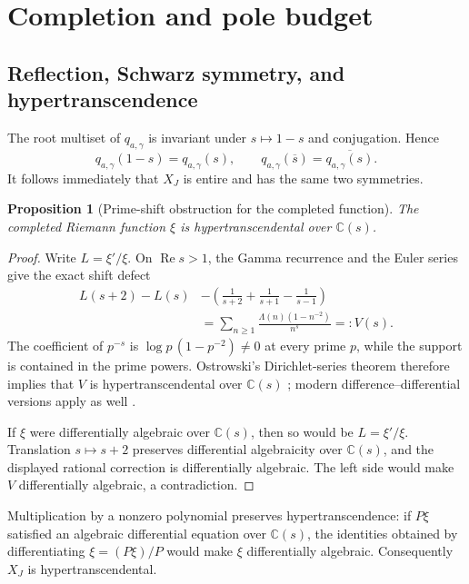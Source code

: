 \documentclass[11pt]{article}
\newtheorem{proposition}[theorem]{Proposition}
\newcommand{\C}{\mathbb C}
\newcommand{\re}{\operatorname{Re}}
\begin{document}
\section{Completion and pole budget}
\label{sec:completion}

\subsection{Reflection, Schwarz symmetry, and hypertranscendence}

The root multiset of \(q_{a,\gamma}\) is invariant under
\(s\mapsto1-s\) and conjugation.  Hence
\[
 q_{a,\gamma}(1-s)=q_{a,\gamma}(s),\qquad
 q_{a,\gamma}(\overline{s})
 =\overline{q_{a,\gamma}(s)}.
\]
It follows immediately that \(X_J\) is entire and has the same two
symmetries.

\begin{proposition}[Prime-shift obstruction for the completed function]
\label{prop:xiht}
The completed Riemann function \(\xi\) is hypertranscendental over
\(\C(s)\).
\end{proposition}

\begin{proof}
Write \(L=\xi'/\xi\).  On \(\re s>1\), the Gamma recurrence and the Euler
series give the exact shift defect
\[
\begin{aligned}
L(s+2)-L(s)
&-\left(\frac1{s+2}+\frac1{s+1}-\frac1{s-1}\right)\\
&=\sum_{n\geq1}
 \frac{\Lambda(n)(1-n^{-2})}{n^s}
 =:V(s).
\end{aligned}
\]
The coefficient of \(p^{-s}\) is
\(\log p\,(1-p^{-2})\neq0\) at every prime \(p\), while the support is
contained in the prime powers.  Ostrowski's Dirichlet-series theorem
therefore implies that \(V\) is hypertranscendental over \(\C(s)\)
\cite{Ostrowski1920}; modern difference--differential versions apply as
well \cite{Nagoshi2016}.

If \(\xi\) were differentially algebraic over \(\C(s)\), then so would be
\(L=\xi'/\xi\).  Translation \(s\mapsto s+2\) preserves differential
algebraicity over \(\C(s)\), and the displayed rational correction is
differentially algebraic.  The left side would make \(V\)
differentially algebraic, a contradiction.
\end{proof}

Multiplication by a nonzero polynomial preserves hypertranscendence:
if \(P\xi\) satisfied an algebraic differential equation over \(\C(s)\),
the identities obtained by differentiating \(\xi=(P\xi)/P\) would make
\(\xi\) differentially algebraic.  Consequently \(X_J\) is
hypertranscendental.
\end{document}
